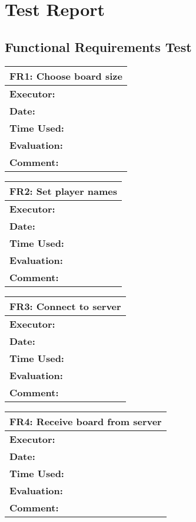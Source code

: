 \section{Test Report}
\label{testreport}

\subsection{Functional Requirements Test}

\begin{tabular}{|m{}||m{}|}
\hline
\multicolumn{2}{|l|}{FR1: Choose board size} \\ \hline
\textbf{Executor:} & \\ \hline
\textbf{Date:} & \\ \hline
\textbf{Time Used:} & \\ \hline
\textbf{Evaluation:} & \\ \hline
\textbf{Comment:} & \\ \hline
\end{tabular}

\begin{tabular}{|m{}||m{}|}
\hline
\multicolumn{2}{|l|}{FR2: Set player names} \\ \hline
\textbf{Executor:} & \\ \hline
\textbf{Date:} & \\ \hline
\textbf{Time Used:} & \\ \hline
\textbf{Evaluation:} & \\ \hline
\textbf{Comment:} & \\ \hline
\end{tabular}

\begin{tabular}{|m{}||m{}|}
\hline
\multicolumn{2}{|l|}{FR3: Connect to server} \\ \hline
\textbf{Executor:} & \\ \hline
\textbf{Date:} & \\ \hline
\textbf{Time Used:} & \\ \hline
\textbf{Evaluation:} & \\ \hline
\textbf{Comment:} & \\ \hline
\end{tabular}

\begin{tabular}{|m{}||m{}|}
\hline
\multicolumn{2}{|l|}{FR4: Receive board from server} \\ \hline
\textbf{Executor:} & \\ \hline
\textbf{Date:} & \\ \hline
\textbf{Time Used:} & \\ \hline
\textbf{Evaluation:} & \\ \hline
\textbf{Comment:} & \\ \hline
\end{tabular}

